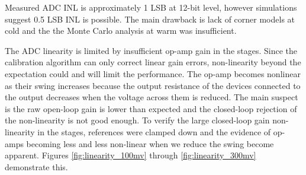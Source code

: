 \label{sec:5.3}


Measured ADC INL is approximately 1 LSB at 12-bit level, however simulations suggest 0.5 LSB INL is possible. The main drawback is lack of corner models at cold and the the Monte Carlo analysis at warm was insufficient.





The ADC linearity is limited by insufficient op-amp gain in the stages. Since the calibration algorithm can only correct linear gain errors, non-linearity beyond the expectation could and will limit the performance. The op-amp becomes nonlinear as their swing increases because the output resistance of the devices connected to the output decreases when the voltage across them is reduced. The main suspect is the raw open-loop gain is lower than expected and the closed-loop rejection of the non-linearity is not good enough. To verify the large closed-loop gain non-linearity in the stages, references were clamped down and the evidence of op-amps becoming less and less non-linear when we reduce the swing become apparent. Figures \ref{fig:linearity_100mv} through \ref{fig:linearity_300mv} demonstrate this. 


